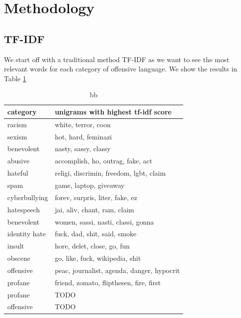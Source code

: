 \documentclass[fleqn,moreauthors,10pt]{ds_report}
\begin{document}
\section*{Methodology}
\subsection*{TF-IDF}
We start off with a traditional method TF-IDF as we want to see the most relevant words for each category of offensive language. We show the results in Table \ref{tab:tf-idf}

\begin{table}[htb]
\centering
\begin{tabular}{l|l}
\toprule
\textbf{category}   & \textbf{unigrams with highest tf-idf score} \\ \midrule
racism     & white, terror, coon                \\ \hline
sexism     & hot, hard, feminazi                \\ \hline
benevolent & nasty, sassy, classy               \\ \hline
abusive    & accomplish, ho, outrag, fake, act  \\ \hline
hateful    & religi, discrimin, freedom, lgbt, claim    \\ \hline
spam       & game, laptop, giveaway             \\ \hline
cyberbullying       & forev, surpris, liter, fake, ez             \\ \hline
hatespeech      & jai, aliv, chant, ram, claim             \\ \hline
benevolent       & women, sassi, nasti, classi, gonna           \\ \hline
identity hate       & fuck, dad, shit, said, smoke             \\ \hline
insult       & hore, delet, close, go, fun        \\ \hline
obscene       & go, like, fuck, wikipedia, shit             \\ \hline
offensive       & peac, journalist, agenda, danger, hypocrit            \\ \hline
profane       & friend, zomato, flipthesen, fire, first             \\ \hline
profane       & TODO             \\ \hline
offensive       & TODO             \\ \bottomrule
\end{tabular}
\caption{bb}
\label{tab:tf-idf}
\end{table}
\end{document}
